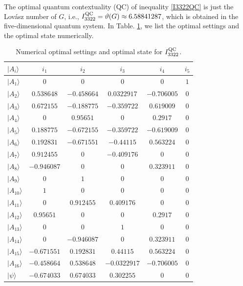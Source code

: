 \documentclass[pra,aps,notitlepage,superscriptaddress,showpacs,showkeys]{revtex4-1}
\theoremstyle{definition}
\theoremstyle{remark}
\begin{document}
The optimal quantum contextuality (QC) of inequality \eqref{I3322QC} is just the Lov\'asz number of $G$, i.e.,  $I_{3322}^{\rm QC}=\vartheta(G)\approx6.58841287$, which is obtained in the
five-dimensional quantum system. In Table. \ref{numerical}, we list
the optimal settings and the optimal state numerically.
\begin{table}[t]
\centering
  \begin{tabular}{lccccc} \hline \hline
$|A_i\rangle$ & $i_1$ & $i_2$ & $i_3$ & $i_4$ & $i_5$ \\
\hline
$|A_1\rangle$  & $0$ & $0$ & $0$ & $0$ & $1$ \\
$|A_2\rangle$  & $0.538648$ & $-0.458664$ & $0.0322917$ & $-0.706005$ & $0$ \\
$|A_3\rangle$  & $0.672155$ & $-0.188775$ & $-0.359722$ & $0.619009$ & $0$ \\
$|A_4\rangle$  & $0$ & $0.95651$ & $0$ & $0.2917$ & $0$ \\
$|A_5\rangle$  & $0.188775$ & $-0.672155$ & $-0.359722$ & $-0.619009$ & $0$ \\
$|A_6\rangle$  & $0.192831$ & $-0.671551$ & $-0.44115$ & $0.563224$ & $0$ \\
$|A_7\rangle$  & $0.912455$ & $0$ & $-0.409176$ & $0$ & $0$ \\
$|A_8\rangle$  & $-0.946087$ & $0$ & $0$ & $0.323911$ & $0$ \\
$|A_9\rangle$  & $0$ & $1$ & $0$ & $0$ & $0$ \\
$|A_{10}\rangle$ & $1$ & $0$ & $0$ & $0$ & $0$ \\
$|A_{11}\rangle$ & $0$ & $0.912455$ & $0.409176$ & $0$ & $0$ \\
$|A_{12}\rangle$ & $0.95651$ & $0$ & $0$ & $0.2917$ & $0$ \\
$|A_{13}\rangle$ & $0$ & $0$ & $1$ & $0$ & $0$ \\
$|A_{14}\rangle$ & $0$ & $-0.946087$ & $0$ & $0.323911$ & $0$ \\
$|A_{15}\rangle$ & $-0.671551$ & $0.192831$ & $0.44115$ & $0.563224$ & $0$ \\
$|A_{16}\rangle$ & $-0.458664$ & $0.538648$ & $-0.0322917$ & $-0.706005$ & $0$ \\
\hline
$|\psi\rangle$ & $-0.674033$ & $0.674033$ & $0.302255$ & $0$ & $0$\\
  \hline \hline
   \end{tabular}
\caption{Numerical optimal settings and optimal state for $I_{3322}^{\rm QC}$.}
\label{numerical}
\end{table}
\end{document}
